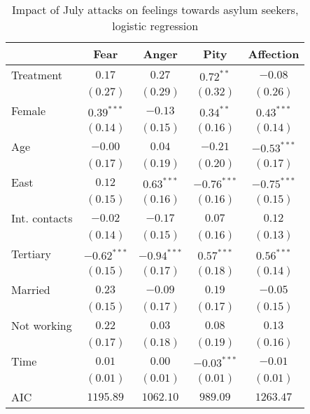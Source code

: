 
\begin{table}
\caption{Impact of July attacks on feelings towards asylum seekers, logistic regression}
\begin{center}
\begin{tabular}{l c c c c}
\toprule
 & Fear & Anger & Pity & Affection \\
\midrule
Treatment      & $0.17$        & $0.27$        & $0.72^{**}$   & $-0.08$       \\
               & $(0.27)$      & $(0.29)$      & $(0.32)$      & $(0.26)$      \\
Female         & $0.39^{***}$  & $-0.13$       & $0.34^{**}$   & $0.43^{***}$  \\
               & $(0.14)$      & $(0.15)$      & $(0.16)$      & $(0.14)$      \\
Age            & $-0.00$       & $0.04$        & $-0.21$       & $-0.53^{***}$ \\
               & $(0.17)$      & $(0.19)$      & $(0.20)$      & $(0.17)$      \\
East           & $0.12$        & $0.63^{***}$  & $-0.76^{***}$ & $-0.75^{***}$ \\
               & $(0.15)$      & $(0.16)$      & $(0.16)$      & $(0.15)$      \\
Int. contacts  & $-0.02$       & $-0.17$       & $0.07$        & $0.12$        \\
               & $(0.14)$      & $(0.15)$      & $(0.16)$      & $(0.13)$      \\
Tertiary       & $-0.62^{***}$ & $-0.94^{***}$ & $0.57^{***}$  & $0.56^{***}$  \\
               & $(0.15)$      & $(0.17)$      & $(0.18)$      & $(0.14)$      \\
Married        & $0.23$        & $-0.09$       & $0.19$        & $-0.05$       \\
               & $(0.15)$      & $(0.17)$      & $(0.17)$      & $(0.15)$      \\
Not working    & $0.22$        & $0.03$        & $0.08$        & $0.13$        \\
               & $(0.17)$      & $(0.18)$      & $(0.19)$      & $(0.16)$      \\
Time           & $0.01$        & $0.00$        & $-0.03^{***}$ & $-0.01$       \\
               & $(0.01)$      & $(0.01)$      & $(0.01)$      & $(0.01)$      \\
\midrule
AIC            & $1195.89$     & $1062.10$     & $989.09$      & $1263.47$     \\

\end{tabular}
\end{center}
\end{table}
